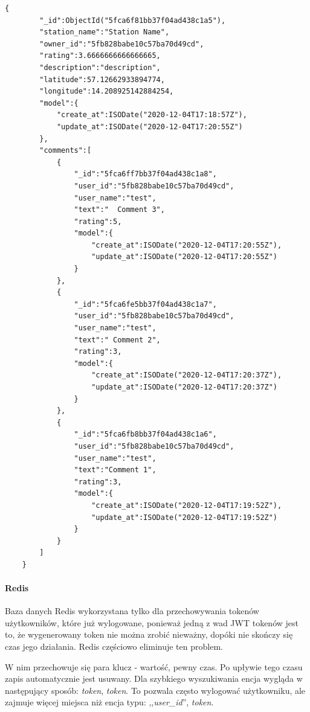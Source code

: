 \begin{lstlisting}[basicstyle=\tiny\ttfamily]
    {
        "_id":ObjectId("5fca6f81bb37f04ad438c1a5"),
        "station_name":"Station Name",
        "owner_id":"5fb828babe10c57ba70d49cd",
        "rating":3.6666666666666665,
        "description":"description",
        "latitude":57.12662933894774,
        "longitude":14.208925142884254,
        "model":{
            "create_at":ISODate("2020-12-04T17:18:57Z"),
            "update_at":ISODate("2020-12-04T17:20:55Z")
        },
        "comments":[
            {
                "_id":"5fca6ff7bb37f04ad438c1a8",
                "user_id":"5fb828babe10c57ba70d49cd",
                "user_name":"test",
                "text":"  Comment 3",
                "rating":5,
                "model":{
                    "create_at":ISODate("2020-12-04T17:20:55Z"),
                    "update_at":ISODate("2020-12-04T17:20:55Z")
                }
            },
            {
                "_id":"5fca6fe5bb37f04ad438c1a7",
                "user_id":"5fb828babe10c57ba70d49cd",
                "user_name":"test",
                "text":" Comment 2",
                "rating":3,
                "model":{
                    "create_at":ISODate("2020-12-04T17:20:37Z"),
                    "update_at":ISODate("2020-12-04T17:20:37Z")
                }
            },
            {
                "_id":"5fca6fb8bb37f04ad438c1a6",
                "user_id":"5fb828babe10c57ba70d49cd",
                "user_name":"test",
                "text":"Comment 1",
                "rating":3,
                "model":{
                    "create_at":ISODate("2020-12-04T17:19:52Z"),
                    "update_at":ISODate("2020-12-04T17:19:52Z")
                }
            }
        ]
    }
\end{lstlisting}

\paragraph{Redis}
\newline
Baza danych Redis wykorzystana tylko dla przechowywania tokenów użytkowników, które już wylogowane, ponieważ jedną z wad JWT tokenów jest to, że wygenerowany token nie można zrobić nieważny, dopóki nie skończy się czas jego działania.
Redis częściowo eliminuje ten problem.

W nim przechowuje się para klucz - wartość, pewny czas. Po upływie tego czasu zapis automatycznie jest usuwany.
Dla szybkiego wyszukiwania encja wygląda w następujący sposób: \textit{token}, \textit{token}. To pozwala często wylogować użytkowniku, ale zajmuje więcej miejsca niż encja typu: ,,\textit{user\_id}'', \textit{token}.

